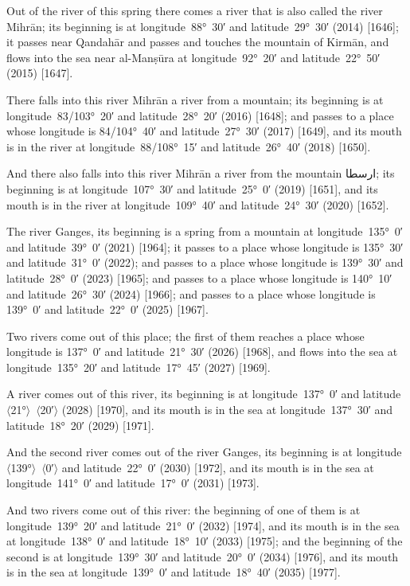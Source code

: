 \documentclass[11pt]{article}
\newcommand{\Pg}[1]{\marginpar{\footnotesize #1}}
\newcommand{\Ang}[1]{\ensuremath{#1}}
\begin{document}
Out of the river of this spring there comes a river that is also called the river Mihrān; its beginning is at longitude~88°~30′ and latitude~29°~30′ (2014) [1646]; it passes near Qandahār and passes and touches the mountain of Kirmān, and flows into the sea near al-Manṣūra at longitude~92°~20′ and latitude~22°~50′ (2015) [1647].

There falls into this river Mihrān a river from a mountain; its beginning is at longitude~83/103°~20′ and latitude~28°~20′ (2016) [1648]; and passes to a place whose longitude is 84/104°~40′ and latitude~27°~30′ (2017) [1649], and its mouth is in the river at longitude~88/108°~15′ and latitude~26°~40′ (2018) [1650].

And there also falls into this river Mihrān a river from the mountain \textarabic{ارسطا}; its beginning is at longitude~107°~30′ and latitude~25°~0′ (2019) [1651], and its mouth is in the river at longitude~109°~40′ and latitude~24°~30′ (2020) [1652].

The river Ganges, its beginning is a spring from a mountain at longitude~135°~0′ and latitude~39°~0′ (2021) [1964]; it passes to a place whose longitude is 135°~30′ and latitude~31°~0′ (2022); and passes to a place whose longitude is 139°~30′ and latitude~28°~0′ (2023) [1965]; and passes to a place whose longitude is 140°~10′ and latitude~26°~30′ (2024) [1966]; and passes to a place whose longitude is 139°~0′ and latitude~22°~0′ (2025) [1967]\Pg{p. 134}.

Two rivers come out of this place; the first of them reaches a place whose longitude is 137°~0′ and latitude~21°~30′ (2026) [1968], and flows into the sea at longitude~135°~20′ and latitude~17°~45′ (2027) [1969].

A river comes out of this river, its beginning is at longitude~137°~0′ and latitude~\Ang{\langle}21°\Ang{\rangle}~\Ang{\langle}20′\Ang{\rangle} (2028) [1970], and its mouth is in the sea at longitude~137°~30′ and latitude~18°~20′ (2029) [1971].

And the second river comes out of the river Ganges, its beginning is at longitude~\Ang{\langle}139°\Ang{\rangle}~\Ang{\langle}0′\Ang{\rangle} and latitude~22°~0′ (2030) [1972], and its mouth is in the sea at longitude~141°~0′ and latitude~17°~0′ (2031) [1973].

And two rivers come out of this river: the beginning of one of them is at longitude~139°~20′ and latitude~21°~0′ (2032) [1974], and its mouth is in the sea at longitude~138°~0′ and latitude~18°~10′ (2033) [1975]; and the beginning of the second is at longitude~139°~30′ and latitude~20°~0′ (2034) [1976], and its mouth is in the sea at longitude~139°~0′ and latitude~18°~40′ (2035) [1977].
\end{document}
